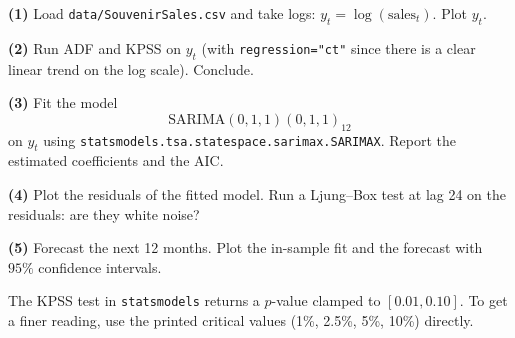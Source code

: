 \documentclass[a4paper,11pt]{article}
\begin{document}
\begin{exercise}
\textbf{(1)} Load \texttt{data/SouvenirSales.csv} and take logs:
$y_t = \log(\text{sales}_t)$. Plot $y_t$.

\textbf{(2)} Run ADF and KPSS on $y_t$ (with \texttt{regression="ct"}
since there is a clear linear trend on the log scale). Conclude.

\textbf{(3)} Fit the model
\[
  \text{SARIMA}(0, 1, 1)(0, 1, 1)_{12}
\]
on $y_t$ using \texttt{statsmodels.tsa.statespace.sarimax.SARIMAX}.
Report the estimated coefficients and the AIC.

\textbf{(4)} Plot the residuals of the fitted model. Run a Ljung--Box
test at lag 24 on the residuals: are they white noise?

\textbf{(5)} Forecast the next 12 months. Plot the in-sample fit and
the forecast with $95\%$ confidence intervals.
\end{exercise}

\bigskip
\begin{warning}
The KPSS test in \texttt{statsmodels} returns a $p$-value clamped to
$[0.01, 0.10]$. To get a finer reading, use the printed critical
values (1\%, 2.5\%, 5\%, 10\%) directly.
\end{warning}
\end{document}
